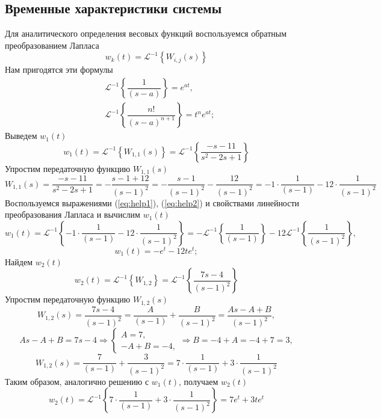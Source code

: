 \documentclass[a4paper, 12pt]{article}
\begin{document}
    \subsection{Временные характеристики системы}
    Для аналитического определения весовых функций воспользуемся
    обратным преобразованием Лапласа
    $$
    w_k(t)=\mathcal{L}^{-1}\left\{ W_{i,j}(s) \right\}
    $$
    Нам пригодятся эти формулы
    \begin{align}
        &\mathcal{L}^{-1}\left\{\dfrac{1}{\left( s-a \right)}\right\}=e^{at},\label{eq:help1} \\
        &\mathcal{L}^{-1}\left\{\dfrac{n!}{\left( s-a \right)^{n+1}}\right\}=t^ne^{at}; \label{eq:help2}
    \end{align}
    Выведем $w_1(t)$
    $$
    w_1(t)=\mathcal{L}^{-1}\left\{ W_{1,1}(s) \right\}=\mathcal{L}^{-1}\left\{ \dfrac{-s-11}{s^2-2s+1} \right\}
    $$
    Упростим передаточную функцию $W_{1,1}(s)$
    $$
    W_{1,1}(s)=\dfrac{-s-11}{s^2-2s+1}=-\dfrac{s-1+12}{\left( s-1 \right)^2}=-\dfrac{s-1}{\left( s-1 \right)^2}-\dfrac{12}{\left( s-1 \right)^2}=
    -1\cdot\dfrac{1}{\left(s-1\right)}-12\cdot\dfrac{1}{\left( s-1 \right)^2}
    $$
    Воспользуемся выражениями (\ref{eq:help1}), (\ref{eq:help2}) и свойствами линейности преобразования Лапласа и вычислим $w_1(t)$
    $$
    w_1(t)=\mathcal{L}^{-1}\left\{ -1\cdot\dfrac{1}{\left(s-1\right)}-12\cdot\dfrac{1}{\left( s-1 \right)^2} \right\}=
    -\mathcal{L}^{-1}\left\{ \dfrac{1}{\left(s-1\right)} \right\}-12\mathcal{L}^{-1}\left\{ \dfrac{1}{\left( s-1 \right)^2} \right\},
    $$
    $$
    w_1(t)=-e^t-12te^t;
    $$
    Найдем $w_2(t)$
    $$
    w_2(t)=\mathcal{L}^{-1}\left\{ W_{1,2} \right\}=\mathcal{L}^{-1}\left\{ \dfrac{7s-4}{\left( s-1 \right)^2} \right\}
    $$
    Упростим передаточную функцию $W_{1,2}(s)$
    $$
    W_{1,2}(s)=\dfrac{7s-4}{\left( s-1 \right)^2}=\dfrac{A}{\left(s-1\right)}+\dfrac{B}{\left( s-1 \right)^2}=\dfrac{As-A+B}{\left( s-1 \right)^2},
    $$
    $$
    As-A+B=7s-4\Rightarrow \begin{cases}
        A=7,\\
        -A+B=-4,
    \end{cases}\Rightarrow B=-4+A=-4+7=3,
    $$
    $$
    W_{1,2}(s)=\dfrac{7}{\left( s-1 \right)}+\dfrac{3}{\left( s-1 \right)^2}=7\cdot\dfrac{1}{\left( s-1 \right)}+3\cdot\dfrac{1}{\left( s-1 \right)^2}
    $$
    Таким образом, аналогично решению с $w_1(t)$, получаем $w_2(t)$
    $$
    w_2(t)=\mathcal{L}^{-1}\left\{ 7\cdot\dfrac{1}{\left( s-1 \right)}+3\cdot\dfrac{1}{\left( s-1 \right)^2} \right\}=7e^t+3te^t
    $$
\end{document}
